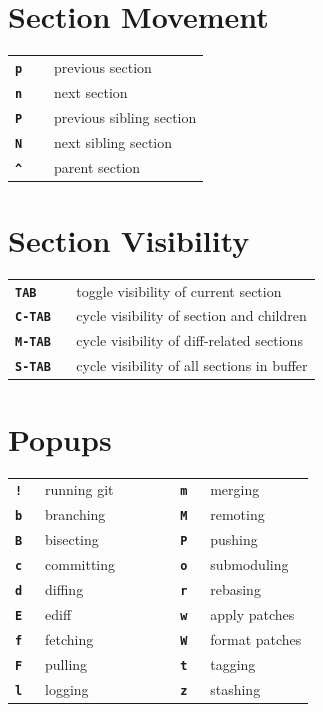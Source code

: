 \documentclass[9pt]{extarticle} %
\begin{document}
\begin{multicols}{3}

  \renewcommand{\arraystretch}{1.1}
  \section*{Section Movement}
  \begin{tabular}{L{0.20\linewidth} L{0.80\linewidth}}
    \tt \textbf{p}  & previous section \\
    \tt \textbf{n}  & next section \\
    \tt \textbf{P}  & previous sibling section \\
    \tt \textbf{N}  & next sibling section \\
    \tt \textbf{\^{}} & parent section
  \end{tabular}


  \section*{Section Visibility}

  \begin{tabular}{L{0.20\linewidth} L{0.80\linewidth}}
    \tt \textbf{TAB} & toggle visibility of current section \\
    \tt \textbf{C-TAB} & cycle visibility of section and children \\
    \tt \textbf{M-TAB} & cycle visibility of diff-related sections \\
    \tt \textbf{S-TAB} & cycle visibility of all sections in buffer
  \end{tabular}

  \columnbreak{}

  \section*{Popups}

  \begin{tabular}{L{0.1\linewidth} L{0.3\linewidth} C{0.15\linewidth}
    L{0.1\linewidth} L{0.35\linewidth}}
    \tt \textbf{!} & running git & & \tt \textbf{m} & merging \\
    \tt \textbf{b} & branching & & \tt \textbf{M} & remoting \\
    \tt \textbf{B} & bisecting & & \tt \textbf{P} & pushing \\
    \tt \textbf{c} & committing & & \tt \textbf{o} & submoduling \\
    \tt \textbf{d} & diffing & & \tt \textbf{r} & rebasing \\
    \tt \textbf{E} & ediff & & \tt \textbf{w} & apply patches \\
    \tt \textbf{f} & fetching & & \tt \textbf{W} & format patches \\
    \tt \textbf{F} & pulling & & \tt \textbf{t} & tagging \\
    \tt \textbf{l} & logging & & \tt \textbf{z} & stashing
  \end{tabular}


\end{multicols}
\end{document}
